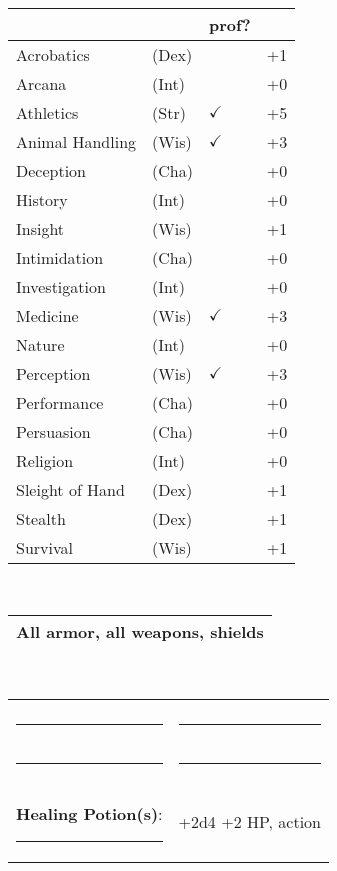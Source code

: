 \documentclass[twocolumn]{article}
\begin{document}
\\
\noindent\begin{tabular}{llll}
 & & prof? & \\
\hline
Acrobatics & (Dex) &  &+1 \\
Arcana & (Int) &  & +0 \\ 
Athletics & (Str) & $\checkmark$ & +5\\
Animal Handling & (Wis) & $\checkmark$ & +3\\
Deception & (Cha) &  & +0 \\
History & (Int) &  & +0 \\
Insight & (Wis) &  & +1 \\
Intimidation & (Cha) &  & +0 \\
Investigation & (Int) &  & +0 \\
Medicine & (Wis) & $\checkmark$ & +3 \\
Nature & (Int) &  & +0 \\
Perception & (Wis) & $\checkmark$ & +3 \\
Performance & (Cha) &  & +0 \\
Persuasion & (Cha) &  & +0 \\
Religion & (Int) &  & +0 \\
Sleight of Hand & (Dex) &  & +1 \\
Stealth & (Dex) &  & +1 \\
Survival & (Wis) &  & +1 \\
\hline
\end{tabular}
\vspace{12pt}

\\
\noindent\begin{tabular}{|m{3.1in}|}
\hline
All armor, all weapons, shields \\
\hline
\end{tabular}
\vspace{12pt}


\\
\noindent\begin{tabular}{|ll|}
\hline&\\
\rule{1.4in}{.2pt}&\rule{1.4in}{.2pt}\\
\rule{1.4in}{.2pt}&\rule{1.4in}{.2pt}\\
\textbf{Healing Potion(s)}: \rule{.2in}{.2pt}& +2d4 +2 HP, {\sc action}\\
\hline
\end{tabular}
\vspace{12pt}
\end{document}

